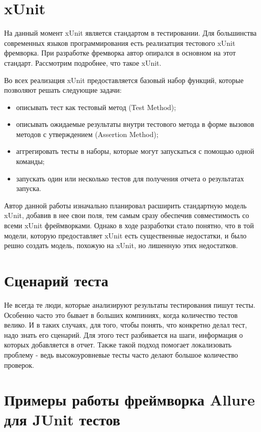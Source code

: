 \section{xUnit}

На данный момент xUnit является стандартом в тестировании. Для большинства современных языков программирования есть реализатция тестового xUnit фремворка. При разработке фремворка автор опирался в основном на этот стандарт. Рассмотрим подробнее, что такое xUnit.

Во всех реализация xUnit предоставляется базовый набор функций, которые позволяют решать следующие задачи:

\begin{itemize}
\item описывать тест как тестовый метод (Test Method);
\item описывать ожидаемые результаты внутри тестового метода в форме вызовов методов с утверждением (Assertion Method);
\item аггрегировать тесты в наборы, которые могут запускаться с помощью одной команды;
\item запускать один или несколько тестов для получения отчета о результатах запуска.
\end{itemize}

Автор данной работы изначально планировал расширить стандартную модель xUnit, добавив в нее свои поля, тем самым сразу обеспечив совместимость со всеми xUnit фреймворками. Однако в ходе разработки стало понятно, что в той модели, которую предоставляет xUnit есть существенные недостатки, и было решно создать модель, похожую на xUnit, но лишенную этих недостатков. 

\section{Сценарий теста}

Не всегда те люди, которые анализируют результаты тестирования пишут тесты. Особенно часто это бывает в больших компиниях, когда количество тестов велико. И в таких случаях, для того, чтобы понять, что конкретно делал тест, надо знать его сценарий. Для этого тест разбивается на шаги, информация о которых добавляется в отчет. Также такой подход помогает локализовать проблему - ведь высокоуровневые тесты часто делают большое количество проверок.

\newpage
\section{Примеры работы фреймворка Allure для JUnit тестов}

